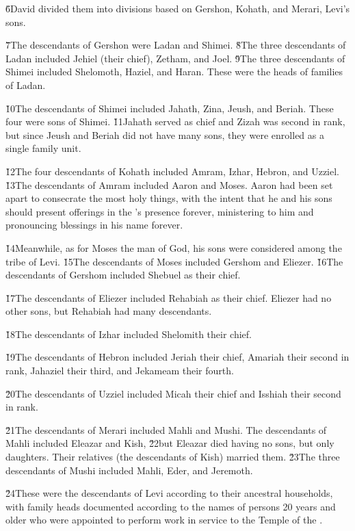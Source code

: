 \v{6}David divided them into divisions based on Gershon, Kohath, and Merari, Levi's sons.

\v{7}The descendants of Gershon were Ladan and Shimei. \v{8}The three descendants of Ladan included Jehiel (their chief), Zetham, and Joel. \v{9}The three descendants of Shimei included Shelomoth, Haziel, and Haran. These were the heads of families of Ladan.

\v{10}The descendants of Shimei included Jahath, Zina, Jeush, and Beriah. These four were sons of Shimei. \v{11}Jahath served as chief and Zizah was second in rank, but since Jeush and Beriah did not have many sons, they were enrolled as a single family unit.

\v{12}The four descendants of Kohath included Amram, Izhar, Hebron, and Uzziel. \v{13}The descendants of Amram included Aaron and Moses. Aaron had been set apart to consecrate the most holy things, with the intent that he and his sons should present offerings in the 's presence forever, ministering to him and pronouncing blessings in his name forever.

\v{14}Meanwhile, as for Moses the man of God, his sons were considered among the tribe of Levi. \v{15}The descendants of Moses included Gershom and Eliezer. \v{16}The descendants of Gershom included Shebuel as their chief.

\v{17}The descendants of Eliezer included Rehabiah as their chief. Eliezer had no other sons, but Rehabiah had many descendants.

\v{18}The descendants of Izhar included Shelomith their chief.

\v{19}The descendants of Hebron included Jeriah their chief, Amariah their second in rank, Jahaziel their third, and Jekameam their fourth.

\v{20}The descendants of Uzziel included Micah their chief and Isshiah their second in rank.

\v{21}The descendants of Merari included Mahli and Mushi. The descendants of Mahli included Eleazar and Kish, \v{22}but Eleazar died having no sons, but only daughters. Their relatives (the descendants of Kish) married them. \v{23}The three descendants of Mushi included Mahli, Eder, and Jeremoth.

\v{24}These were the descendants of Levi according to their ancestral households, with family heads documented according to the names of persons 20 years and older who were appointed to perform work in service to the Temple of the .

